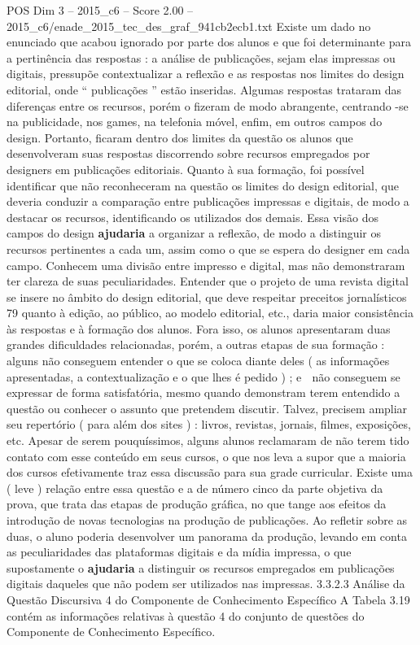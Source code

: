 \begin{textsample}{POS Dim 3 – 2015\_c6 – Score 2.00 – 2015\_c6/enade\_2015\_tec\_des\_graf\_941cb2ecb1.txt}
Existe um dado no enunciado que acabou ignorado por parte dos alunos e que foi determinante para a pertinência das respostas : a análise de publicações, sejam elas impressas ou digitais, pressupõe contextualizar a reflexão e as respostas nos limites do design editorial, onde “ publicações ” estão inseridas.
Algumas respostas trataram das diferenças entre os recursos, porém o fizeram de modo abrangente, centrando -se na publicidade, nos games, na telefonia móvel, enfim, em outros campos do design.
Portanto, ficaram dentro dos limites da questão os alunos que desenvolveram suas respostas discorrendo sobre recursos empregados por designers em publicações editoriais.
Quanto à sua formação, foi possível identificar que não reconheceram na questão os limites do design editorial, que deveria conduzir a comparação entre publicações impressas e digitais, de modo a destacar os recursos, identificando os utilizados dos demais.
Essa visão dos campos do design \textbf{ajudaria} a organizar a reflexão, de modo a distinguir os recursos pertinentes a cada um, assim como o que se espera do designer em cada campo.
Conhecem uma divisão entre impresso e digital, mas não demonstraram ter clareza de suas peculiaridades.
Entender que o projeto de uma revista digital se insere no âmbito do design editorial, que deve respeitar preceitos jornalísticos 79 quanto à edição, ao público, ao modelo editorial, etc., daria maior consistência às respostas e à formação dos alunos.
Fora isso, os alunos apresentaram duas grandes dificuldades relacionadas, porém, a outras etapas de sua formação :  alguns não conseguem entender o que se coloca diante deles ( as informações apresentadas, a contextualização e o que lhes é pedido ) ; e  não conseguem se expressar de forma satisfatória, mesmo quando demonstram terem entendido a questão ou conhecer o assunto que pretendem discutir.
Talvez, precisem ampliar seu repertório ( para além dos sites ) : livros, revistas, jornais, filmes, exposições, etc.
Apesar de serem pouquíssimos, alguns alunos reclamaram de não terem tido contato com esse conteúdo em seus cursos, o que nos leva a supor que a maioria dos cursos efetivamente traz essa discussão para sua grade curricular.
Existe uma ( leve ) relação entre essa questão e a de número cinco da parte objetiva da prova, que trata das etapas de produção gráfica, no que tange aos efeitos da introdução de novas tecnologias na produção de publicações.
Ao refletir sobre as duas, o aluno poderia desenvolver um panorama da produção, levando em conta as peculiaridades das plataformas digitais e da mídia impressa, o que supostamente o \textbf{ajudaria} a distinguir os recursos empregados em publicações digitais daqueles que não podem ser utilizados nas impressas. 3.3.2.3 Análise da Questão Discursiva 4 do Componente de Conhecimento Específico A Tabela 3.19 contém as informações relativas à questão 4 do conjunto de questões do Componente de Conhecimento Específico.

\end{textsample}
